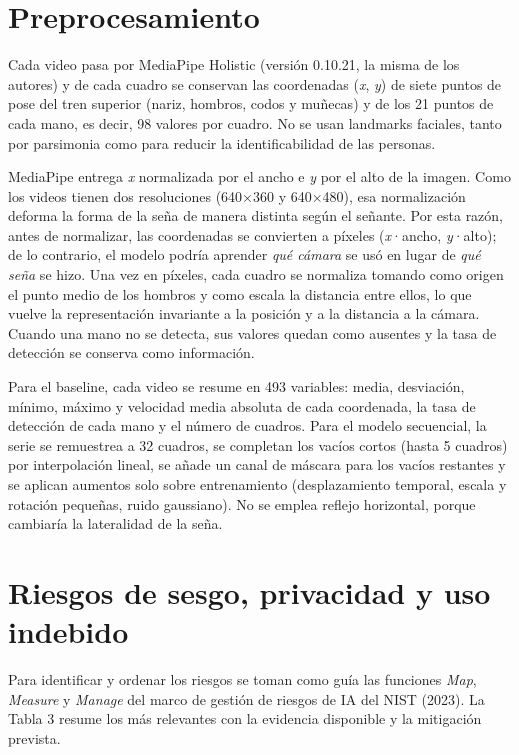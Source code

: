 \documentclass[11pt,a4paper]{article}
\begin{document}
\section{Preprocesamiento}

Cada video pasa por MediaPipe Holistic (versión 0.10.21, la misma de los autores) y de cada cuadro se conservan las coordenadas (\emph{x}, \emph{y}) de siete puntos de pose del tren superior (nariz, hombros, codos y muñecas) y de los 21 puntos de cada mano, es decir, 98 valores por cuadro. No se usan landmarks faciales, tanto por parsimonia como para reducir la identificabilidad de las personas.

MediaPipe entrega \emph{x} normalizada por el ancho e \emph{y} por el alto de la imagen. Como los videos tienen dos resoluciones (640×360 y 640×480), esa normalización deforma la forma de la seña de manera distinta según el señante. Por esta razón, antes de normalizar, las coordenadas se convierten a píxeles (\emph{x}·ancho, \emph{y}·alto); de lo contrario, el modelo podría aprender \emph{qué cámara} se usó en lugar de \emph{qué seña} se hizo. Una vez en píxeles, cada cuadro se normaliza tomando como origen el punto medio de los hombros y como escala la distancia entre ellos, lo que vuelve la representación invariante a la posición y a la distancia a la cámara. Cuando una mano no se detecta, sus valores quedan como ausentes y la tasa de detección se conserva como información.

Para el baseline, cada video se resume en 493 variables: media, desviación, mínimo, máximo y velocidad media absoluta de cada coordenada, la tasa de detección de cada mano y el número de cuadros. Para el modelo secuencial, la serie se remuestrea a 32 cuadros, se completan los vacíos cortos (hasta 5 cuadros) por interpolación lineal, se añade un canal de máscara para los vacíos restantes y se aplican aumentos solo sobre entrenamiento (desplazamiento temporal, escala y rotación pequeñas, ruido gaussiano). No se emplea reflejo horizontal, porque cambiaría la lateralidad de la seña.

\section{Riesgos de sesgo, privacidad y uso indebido}

Para identificar y ordenar los riesgos se toman como guía las funciones \emph{Map}, \emph{Measure} y \emph{Manage} del marco de gestión de riesgos de IA del NIST (2023). La Tabla 3 resume los más relevantes con la evidencia disponible y la mitigación prevista.
\end{document}

